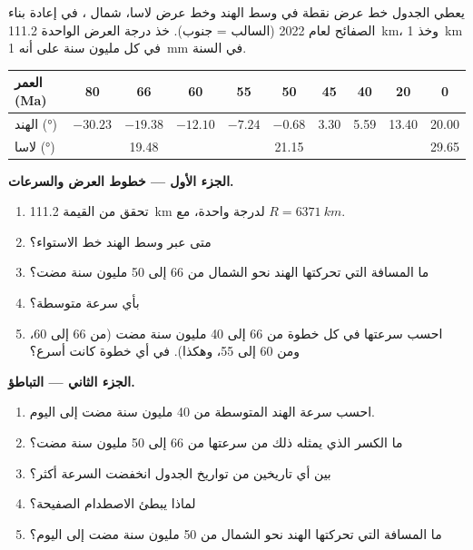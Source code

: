 \begin{problem}
\label{pb:g12:mountain-building:1}
يعطي الجدول خط عرض نقطة في وسط الهند وخط عرض لاسا،
شمال ، في إعادة بناء الصفائح لعام 2022 (السالب = جنوب).
خذ درجة العرض الواحدة \qty{111.2}{km}، وخذ \qty{1}{km} في كل مليون
سنة على أنه \qty{1}{mm} في السنة.

\begin{center}
\small
\begin{tabular}{|l|c|c|c|c|c|c|c|c|c|}
\hline
العمر (\unit{Ma}) & 80 & 66 & 60 & 55 & 50 & 45 & 40 & 20 & 0 \\ \hline
الهند (\unit{\degree}) & $-30.23$ & $-19.38$ & $-12.10$ & $-7.24$ & $-0.68$ & 3.30 & 5.59 & 13.40 & 20.00 \\ \hline
لاسا (\unit{\degree}) & & 19.48 & & & 21.15 & & & & 29.65 \\ \hline
\end{tabular}
\end{center}

\medskip
\noindent\textbf{الجزء الأول --- خطوط العرض والسرعات.}
\begin{enumerate}
  \item تحقق من القيمة \qty{111.2}{km} لدرجة واحدة، مع $R =
        \qty{6371}{km}$.
  \item متى عبر وسط الهند خط الاستواء؟
  \item ما المسافة التي تحركتها الهند نحو الشمال من 66 إلى 50 مليون سنة مضت؟
  \item بأي سرعة متوسطة؟
  \item احسب سرعتها في كل خطوة من 66 إلى 40 مليون سنة مضت (من 66
        إلى 60، ومن 60 إلى 55، وهكذا). في أي خطوة كانت أسرع؟
\end{enumerate}

\medskip
\noindent\textbf{الجزء الثاني --- التباطؤ.}
\begin{enumerate}[resume]
  \item احسب سرعة الهند المتوسطة من 40 مليون سنة مضت إلى اليوم.
  \item ما الكسر الذي يمثله ذلك من سرعتها من 66 إلى 50 مليون سنة مضت؟
  \item بين أي تاريخين من تواريخ الجدول انخفضت السرعة أكثر؟
  \item لماذا يبطئ الاصطدام الصفيحة؟
  \item ما المسافة التي تحركتها الهند نحو الشمال من 50 مليون سنة مضت إلى اليوم؟
\end{enumerate}


\end{problem}
